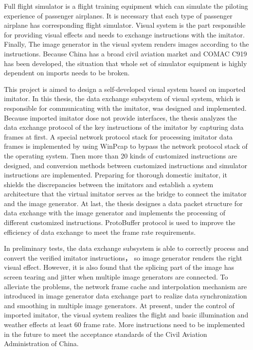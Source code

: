 \documentclass[winfonts,master,oneside]{njuthesis}
\begin{document}
\begin{englishabstract}
	{Full flight simulator is a flight training equipment which can simulate the piloting experience of passenger airplanes.
    It is necessary that each type of passenger airplane has corresponding flight simulator.
    Visual system is the part responsible for providing visual effects and needs to exchange instructions with the imitator.
    Finally, The image generator in the visual system renders images according to the instructions.
    Because China has a broad civil aviation market and COMAC C919 has been developed, the situation that whole set of simulator equipment is highly dependent on imports needs to be broken.
    \par
    This project is aimed to design a self-developed visual system based on imported imitator.
    In this thesis, the data exchange subsystem of visual system, which is responsible for communicating with the imitator, was designed and implemented.
    Because imported imitator dose not provide interfaces, the thesis analyzes the data exchange protocol of the key instructions of the imitator by capturing data frames at first.
    A special network protocol stack for processing imitator data frames is implemented by using WinPcap to bypass the network protocol stack of the operating system.
    Tnen more than 20 kinds of customized instructions are designed, and conversion methods between customized instructions and simulator instructions are implemented.
    Preparing for thorough domestic imitator, it shields the discrepancies between the imitators and establish a system architecture that the virtual imitator serves as the bridge to connect the imitator and the image generator.
    At last, the thesis designes a data packet structure for data exchange with the image generator and implements the processing of different customized instructions. 
    ProtoBuffer protocol is used to improve the efficiency of data exchange to meet the frame rate requirements.
    \par
    In preliminary tests, the data exchange subsystem is able to correctly process and convert the verified imitator instructions， so image generator renders the right visual effect.
    However, it is also found that the splicing part of the image has screen tearing and jitter when multiple image generators are connected.
    To alleviate the problems, the network frame cache and interpolation mechanism are introduced in image generator data exchange part to realize data synchronization and smoothing in multiple image generators.
    At present, under the control of imported imitator, the visual system realizes the flight and basic illumination and weather effects at least 60 frame rate. 
    More instructions need to be implemented in the future to meet the acceptance standards of the Civil Aviation Administration of China.
    }
\end{englishabstract}
\end{document}
